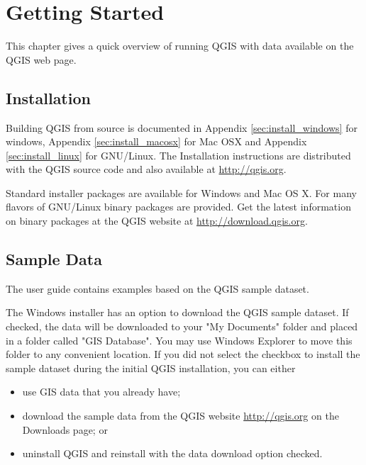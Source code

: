 \section{Getting Started}\label{label_getstarted}

\updatedisclaimer

This chapter gives a quick overview of running QGIS with data available on the QGIS web page.

\subsection{Installation}\label{label_installation}

Building QGIS from source is documented in \win Appendix \ref{sec:install_windows} for windows,
\osx Appendix \ref{sec:install_macosx} for Mac OSX and \nix Appendix \ref{sec:install_linux} for GNU/Linux. 
The Installation instructions are distributed with the QGIS source code and also available 
at \url{http://qgis.org}. 

Standard installer packages are available for Windows and Mac OS X. For many 
flavors of GNU/Linux binary packages are provided. Get the latest information 
on binary packages at the QGIS website at \url{http://download.qgis.org}.

\subsection{Sample Data}\label{label_sampledata}

The user guide contains examples based on the QGIS sample dataset. 

\win The Windows installer has an option to download the QGIS sample dataset.
If checked, the data will be downloaded to your "My Documents" folder and placed
in a folder called "GIS Database". 
You may use Windows Explorer to move this folder to any convenient location.
If you did not select the checkbox to install the sample dataset
during the initial QGIS installation, you can either
\begin{itemize}
\item{use GIS data that you already have;}
\item{download the sample data from the QGIS website
 \url{http://qgis.org} on the Downloads page; or}
\item{uninstall QGIS and reinstall with the data download option checked.}
\end{itemize}

